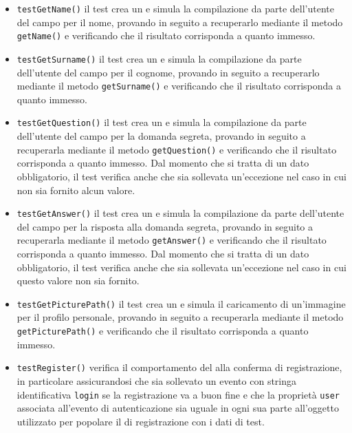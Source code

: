 \begin{itemize}
\begin{itemize}
\item \texttt{testGetName()} il test crea un  e simula la compilazione da parte dell'utente del campo per il nome, provando in seguito a recuperarlo mediante il metodo \texttt{getName()} e verificando che il risultato corrisponda a quanto immesso.

\item \texttt{testGetSurname()} il test crea un  e simula la compilazione da parte dell'utente del campo per il cognome, provando in seguito a recuperarlo mediante il metodo \texttt{getSurname()} e verificando che il risultato corrisponda a quanto immesso.

\item \texttt{testGetQuestion()}  il test crea un  e simula la compilazione da parte dell'utente del campo per la domanda segreta, provando in seguito a recuperarla mediante il metodo \texttt{getQuestion()} e verificando che il risultato corrisponda a quanto immesso. Dal momento che si tratta di un dato obbligatorio, il test verifica anche che sia sollevata un'eccezione nel caso in cui non sia fornito alcun valore.

\item \texttt{testGetAnswer()} il test crea un  e simula la compilazione da parte dell'utente del campo per la risposta alla domanda segreta, provando in seguito a recuperarla mediante il metodo \texttt{getAnswer()} e verificando che il risultato corrisponda a quanto immesso. Dal momento che si tratta di un dato obbligatorio, il test verifica anche che sia sollevata un'eccezione nel caso in cui questo valore non sia fornito.

\item \texttt{testGetPicturePath()} il test crea un  e simula il caricamento di un'immagine per il profilo personale, provando in seguito a recuperarla mediante il metodo \texttt{getPicturePath()} e verificando che il risultato corrisponda a quanto immesso.

\item \texttt{testRegister()} verifica il comportamento del  alla conferma di registrazione, in particolare assicurandosi che sia sollevato un evento con stringa identificativa \verb'login' se la registrazione va a buon fine e che la proprietà \verb'user' associata all'evento di autenticazione sia uguale in ogni sua parte all'oggetto utilizzato per popolare il  di registrazione con i dati di test.


\end{itemize}
\end{itemize}
